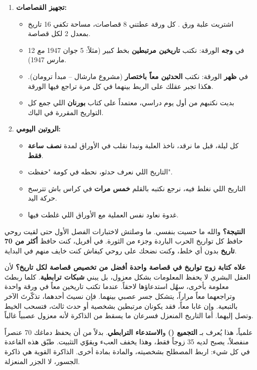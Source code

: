 \documentclass[12pt,a4paper]{book}
\begin{document}
	\begin{enumerate}
		\item \textbf{تجهيز القصاصات:}
		\begin{itemize}
			\item اشتريت علبة ورق . كل ورقة عطتني 8 قصاصات، مساحة تكفي 16 تاريخ بمعدل 2 لكل قصاصة.
			\item في \textbf{وجه} الورقة: نكتب \textbf{تاريخين مرتبطين} بخط كبير (مثلاً: 5 جوان 1947 \textit{مع} 12 مارس 1947).
			\item في \textbf{ظهر} الورقة: نكتب \textbf{الحدثين معاً باختصار} (مشروع مارشال – مبدأ ترومان). هكذا تجبر عقلك على الربط بينهما في كل مرة تراجع فيها الورقة.
			\item بديت نكتبهم من أول يوم دراسي، معتمداً على كتاب \textbf{بورنان} اللي جمع كل التواريخ المقررة في الباك.
		\end{itemize}
		
		\item \textbf{الروتين اليومي:}
		\begin{itemize}
			\item كل ليلة، قبل ما نرقد، ناخذ العلبة ونبدا نقلب في الأوراق لمدة \textbf{نصف ساعة فقط}.
			\item التاريخ اللي نعرف حدثو، نحطه في كومة "حفظت".
			\item التاريخ اللي نغلط فيه، نرجع نكتبه بالقلم \textbf{خمس مرات} في كراس باش تترسخ حركة اليد.
			\item غدوة نعاود نفس العملية مع الأوراق اللي غلطت فيها.
		\end{itemize}
	\end{enumerate}
	
	\vspace{1em}
	\textbf{النتيجة؟} والله ما حسيت بنفسي. ما وصلتش لاختبارات الفصل الأول حتى لقيت روحي حافظ كل تواريخ الحرب الباردة وجزء من الثورة. في أفريل، كنت حافظ \textbf{أكثر من 70 تاريخ} بدون أي خلط، وكنت نضحك على روحي كيفاش كنت خايف منهم في البداية.
	
	\vspace{1em}
	\textbf{علاه كتابة زوج تواريخ في قصاصة واحدة أفضل من تخصيص قصاصة لكل تاريخ؟} لأن العقل البشري لا يحفظ المعلومات بشكل معزول، بل يبني \textbf{شبكات ترابطية}. كلما ربطتَ معلومة بأخرى، سهُل استدعاؤها لاحقاً. عندما تكتب تاريخين معاً في ورقة واحدة وتراجعهما معاً مراراً، يتشكل جسر عصبي بينهما. فإن نسيتَ أحدهما، تذكّرتَ الآخر بالتبعية. وإن غابا معاً، فقد يكونان مرتبطين بشخصية أو حدث ثالث، فتسحب الخيط وتصل إليهما. أما التاريخ المنعزل فسرعان ما يسقط من الذاكرة لأنه معزول عصبياً غالباً.
	
	علمياً، هذا يُعرف بـ \textbf{التجميع ()} و\textbf{الاستدعاء الترابطي}. بدلاً من أن يحفظ دماغك 70 عنصراً منفصلاً، يصبح لديه 35 زوجاً فقط، وهذا يخفف العبء ويقوّي التثبيت. طبّق هذه القاعدة في كل شيء: اربط المصطلح بشخصيته، والمادة بمادة أخرى. الذاكرة القوية هي ذاكرة الجسور، لا الجزر المنعزلة.
	
\end{document}
